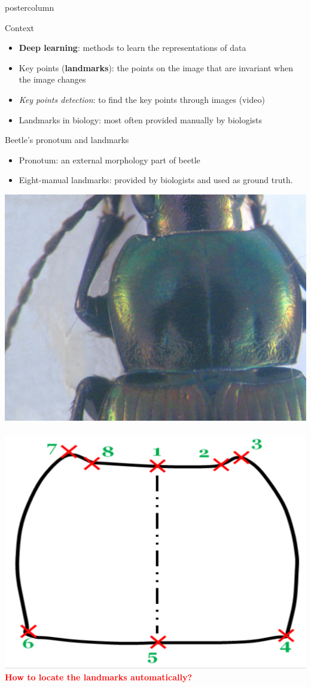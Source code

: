 \begin{frame}
  \begin{columns}
    \begin{column}{.49\textwidth}
      \begin{beamercolorbox}[center,wd=\textwidth]{postercolumn}
        \begin{minipage}[T]{.95\textwidth}
          \parbox[t][\columnheight]{\textwidth}{
            \begin{block}{Context}
            	\begin{itemize}
            		\item \textbf{Deep learning}\cite{lecun2015deep}: methods to learn the representations of data 
            		\item Key points (\textbf{landmarks}): the points on the image that are invariant when the image changes
             		\item \textit{Key points detection}: to find the key points through images (video)
             		\item Landmarks in biology: most often provided manually by biologists
            	\end{itemize}
            \end{block}
            
            \vfill
            
            \begin{block}{Beetle's pronotum and landmarks}
            \begin{itemize}
            	\item Pronotum: an external morphology part of beetle
            	\item Eight-manual landmarks: provided by biologists and used as ground truth.
            \end{itemize}
            \centering
            
            \includegraphics[width=.43\textwidth]{images/pronotum.JPG}~~
            \includegraphics[width=.43\textwidth]{images/pronotum.png}            \\[0.2cm]
            \textbf{\textcolor{red}{How to locate the landmarks automatically?}}
            \end{block}
            
}
\end{minipage}
\end{beamercolorbox}
\end{column}
\end{columns}
\end{frame}
